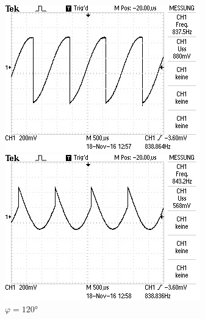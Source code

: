 \begin{figure}[!h]
\begin{minipage}[t]{0.3\textwidth}
\includegraphics[width=\textwidth]{Bilder/Rausch0.jpg}
\caption{$\varphi = 0\si{\degree}$}
\label{fig:7}
\end{minipage}
\hspace{10pt}
\vspace{5pt}
\begin{minipage}[t]{0.3\textwidth}
\includegraphics[width=\textwidth]{Bilder/Rausch120.jpg}
\caption{$\varphi = 120\si{\degree}$}
\label{fig:8}
\end{minipage}
\hspace{10pt}
\vspace{5pt}

\end{figure}

